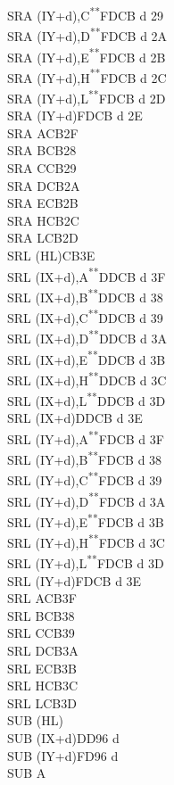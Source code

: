 \documentclass[twoside,openright,a4paper]{book}
\newcommand{\UNDOC}{\textnormal{\textsuperscript{**}}}
\begin{document}
\begin{multicols}{3}
{\begin{tabbing}
	SRA (IY+d),C\UNDOC\>FDCB d 29\\
	SRA (IY+d),D\UNDOC\>FDCB d 2A\\
	SRA (IY+d),E\UNDOC\>FDCB d 2B\\
	SRA (IY+d),H\UNDOC\>FDCB d 2C\\
	SRA (IY+d),L\UNDOC\>FDCB d 2D\\
	SRA (IY+d)\>FDCB d 2E\\
	SRA A\>CB2F\\
	SRA B\>CB28\\
	SRA C\>CB29\\
	SRA D\>CB2A\\
	SRA E\>CB2B\\
	SRA H\>CB2C\\
	SRA L\>CB2D\\
	SRL (HL)\>CB3E\\
	SRL (IX+d),A\UNDOC\>DDCB d 3F\\
	SRL (IX+d),B\UNDOC\>DDCB d 38\\
	SRL (IX+d),C\UNDOC\>DDCB d 39\\
	SRL (IX+d),D\UNDOC\>DDCB d 3A\\
	SRL (IX+d),E\UNDOC\>DDCB d 3B\\
	SRL (IX+d),H\UNDOC\>DDCB d 3C\\
	SRL (IX+d),L\UNDOC\>DDCB d 3D\\
	SRL (IX+d)\>DDCB d 3E\\
	SRL (IY+d),A\UNDOC\>FDCB d 3F\\
	SRL (IY+d),B\UNDOC\>FDCB d 38\\
	SRL (IY+d),C\UNDOC\>FDCB d 39\\
	SRL (IY+d),D\UNDOC\>FDCB d 3A\\
	SRL (IY+d),E\UNDOC\>FDCB d 3B\\
	SRL (IY+d),H\UNDOC\>FDCB d 3C\\
	SRL (IY+d),L\UNDOC\>FDCB d 3D\\
	SRL (IY+d)\>FDCB d 3E\\
	SRL A\>CB3F\\
	SRL B\>CB38\\
	SRL C\>CB39\\
	SRL D\>CB3A\\
	SRL E\>CB3B\\
	SRL H\>CB3C\\
	SRL L\>CB3D\\
	SUB (HL)\\
	SUB (IX+d)\>DD96 d\\
	SUB (IY+d)\>FD96 d\\
	SUB A\\

\end{tabbing}}
\end{multicols}
\end{document}

